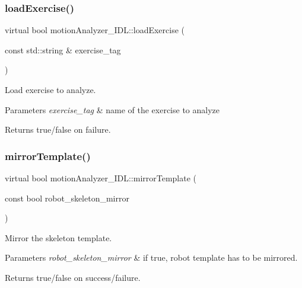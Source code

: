 \subsubsection{\texorpdfstring{load\+Exercise()}{loadExercise()}}
{\footnotesize\ttfamily virtual bool motion\+Analyzer\+\_\+\+I\+D\+L\+::load\+Exercise (\begin{DoxyParamCaption}\item[{const std\+::string \&}]{exercise\+\_\+tag }\end{DoxyParamCaption})\hspace{0.3cm}{\ttfamily [virtual]}}



Load exercise to analyze. 


\begin{DoxyParams}{Parameters}
{\em exercise\+\_\+tag} & name of the exercise to analyze \\
\hline
\end{DoxyParams}
\begin{DoxyReturn}{Returns}
true/false on failure. 
\end{DoxyReturn}
\mbox{\label{classmotionAnalyzer__IDL_a7c16a7a17fa15d7bc8ef369f7de0c90f}} 
\subsubsection{\texorpdfstring{mirror\+Template()}{mirrorTemplate()}}
{\footnotesize\ttfamily virtual bool motion\+Analyzer\+\_\+\+I\+D\+L\+::mirror\+Template (\begin{DoxyParamCaption}\item[{const bool}]{robot\+\_\+skeleton\+\_\+mirror }\end{DoxyParamCaption})\hspace{0.3cm}{\ttfamily [virtual]}}



Mirror the skeleton template. 


\begin{DoxyParams}{Parameters}
{\em robot\+\_\+skeleton\+\_\+mirror} & if true, robot template has to be mirrored. \\
\hline
\end{DoxyParams}
\begin{DoxyReturn}{Returns}
true/false on success/failure. 
\end{DoxyReturn}
\mbox{\label{classmotionAnalyzer__IDL_a7e166c4cc32ecf37cf1a3e0235e0bb4d}} 
